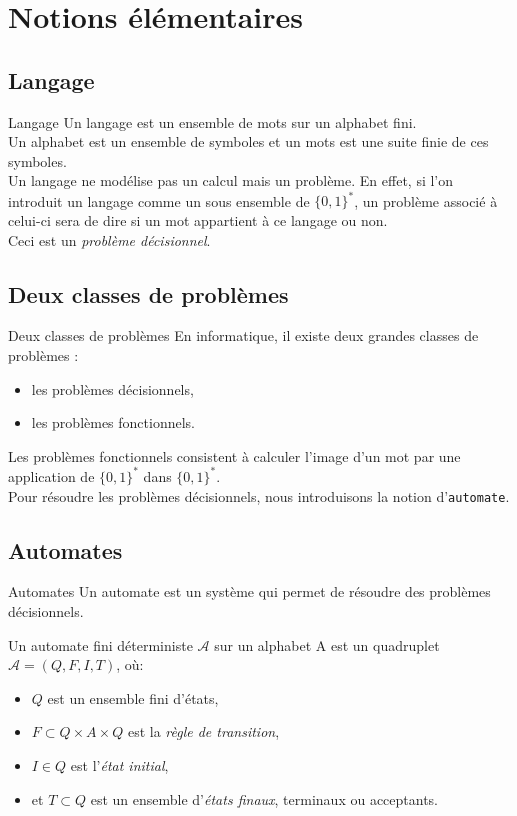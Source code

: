 \documentclass[utf8,10pt,french]{beamer}
\newcommand{\nam}[1]{\texttt{\color{blue}#1}}
\newcommand{\var}[1]{\textit{\color{green!50!black}#1}}
\begin{document}
\section{Notions élémentaires}
\subsection{Langage}
\begin{frame}{Langage}
Un langage est un ensemble de mots sur un alphabet fini.\\
Un alphabet est un ensemble de symboles et un mots est une suite finie de ces symboles.\\
Un langage ne modélise pas un calcul mais un problème. En effet, si l'on introduit un langage comme un sous ensemble de $\{0,1\}^*$, un problème associé à celui-ci sera de dire si un mot appartient à ce langage ou non.\\
Ceci est un \var{problème décisionnel}.
\end{frame}

\subsection{Deux classes de problèmes}

\begin{frame}{Deux classes de problèmes}
En informatique, il existe deux grandes classes de problèmes :
\begin{itemize}
\item les problèmes décisionnels,
\item les problèmes fonctionnels.
\end{itemize}
Les problèmes fonctionnels consistent à calculer l'image d'un mot par une application de $\{0,1\}^*$ dans $\{0,1\}^*$.\\
Pour résoudre les problèmes décisionnels, nous introduisons la notion d'\nam{automate}.
\end{frame}

\subsection{Automates}
\begin{frame}{Automates}
Un automate est un système qui permet de résoudre des problèmes décisionnels.\\
\begin{definition} 
Un automate fini déterministe $\mathcal{A}$  sur un alphabet A est un quadruplet $\mathcal{A}=(Q,F,I,T)$, où:
\begin{itemize}
	\item $Q$ est un ensemble fini d'états,
	\item $F \subset Q \times A \times Q$ est la \var{règle de transition},
	\item $I \in Q$ est l'\var{état initial},
	\item et $T \subset Q$ est un ensemble d'\var{états finaux}, terminaux ou acceptants.
\end{itemize}
\end{definition}
\end{frame}
\end{document}
